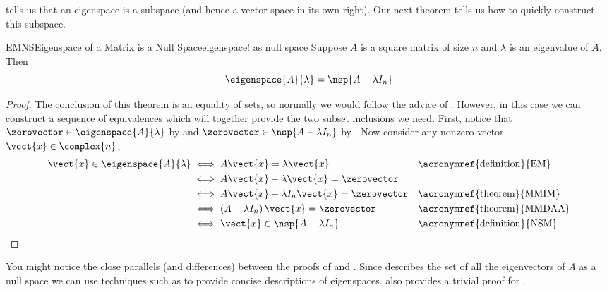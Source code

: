 %
 tells us that an eigenspace is a subspace (and hence a vector space in its own right).  Our next theorem tells us how to quickly construct this subspace.
%
\begin{theorem}{EMNS}{Eigenspace of a Matrix is a Null Space}{eigenspace! as null space}
Suppose  $A$ is a square matrix of size $n$ and $\lambda$ is an eigenvalue of $A$.  Then
%
\begin{equation*}
\eigenspace{A}{\lambda}=\nsp{A-\lambda I_n}
\end{equation*}
%
\end{theorem}
%
\begin{proof}
The conclusion of this theorem is an equality of sets, so normally we would follow the advice of .  However, in this case we can construct a sequence of equivalences which will together provide the two subset inclusions we need.  First, notice that $\zerovector\in\eigenspace{A}{\lambda}$ by  and $\zerovector\in\nsp{A-\lambda I_n}$ by .  Now consider any nonzero vector $\vect{x}\in\complex{n}$,
%
\begin{align*}
\vect{x}\in\eigenspace{A}{\lambda}&\iff A\vect{x}=\lambda\vect{x}&&\text{\acronymref{definition}{EM}}\\
&\iff A\vect{x}-\lambda\vect{x}=\zerovector\\
&\iff A\vect{x}-\lambda I_n\vect{x}=\zerovector&&\text{\acronymref{theorem}{MMIM}}\\
&\iff\left(A-\lambda I_n\right)\vect{x}=\zerovector&&\text{\acronymref{theorem}{MMDAA}}\\
&\iff\vect{x}\in\nsp{A-\lambda I_n}&&\text{\acronymref{definition}{NSM}}
\end{align*}
%
\end{proof}
%
You might notice the close parallels (and differences) between the proofs of  and .  Since  describes the set of all the eigenvectors of $A$ as a null space we can use techniques such as  to provide concise descriptions of eigenspaces.   also provides a trivial proof for .
%
